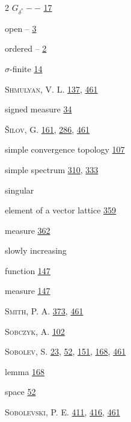 \begin{multicols}{2}
\hspace*{1.1em}$ G_{\delta^{*}} -- $ \hyperlink{page.17}{17}\par
\hspace*{1.1em}open -- \hyperlink{page.3}{3}\par
\hspace*{1.1em}ordered -- \hyperlink{page.2}{2}\par
\noindent $ \sigma $-finite \hyperlink{page.14}{14}\par
\noindent \textsc{Shmulyan}, V. L. \hyperlink{page.137}{137}, \hyperlink{page.461}{461}\par
\noindent signed measure \hyperlink{page.34}{34}\par
\noindent \textsc{Šilov}, G. \hyperlink{page.161}{161}, \hyperlink{page.286}{286}, \hyperlink{page.461}{461}\par
\noindent simple convergence topology \hyperlink{page.107}{107}\par
\noindent simple spectrum \hyperlink{page.310}{310}, \hyperlink{page.333}{333}\par
\noindent singular\par
\hspace*{1.1em}element of a vector lattice \hyperlink{page.359}{359}\par
\hspace*{1.1em}measure \hyperlink{page.362}{362}\par
\noindent slowly increasing\par
\hspace*{1.1em}function \hyperlink{page.147}{147}\par
\hspace*{1.1em}measure \hyperlink{page.147}{147}\par
\noindent \textsc{Smith}, P. A. \hyperlink{page.373}{373}, \hyperlink{page.461}{461}\par
\noindent \textsc{Sobczyk}, A. \hyperlink{page.102}{102}\par
\noindent \textsc{Sobolev}, S. \hyperlink{page.23}{23}, \hyperlink{page.52}{52}, \hyperlink{page.151}{151}, \hyperlink{page.168}{168}, \hyperlink{page.461}{461}\par
\hspace*{1.1em}lemma \hyperlink{page.168}{168}\par
\hspace*{1.1em}space \hyperlink{page.52}{52}\par
\noindent \textsc{Sobolevski}, P. E. \hyperlink{page.411}{411}, \hyperlink{page.416}{416}, \hyperlink{page.461}{461}\par

\end{multicols}
